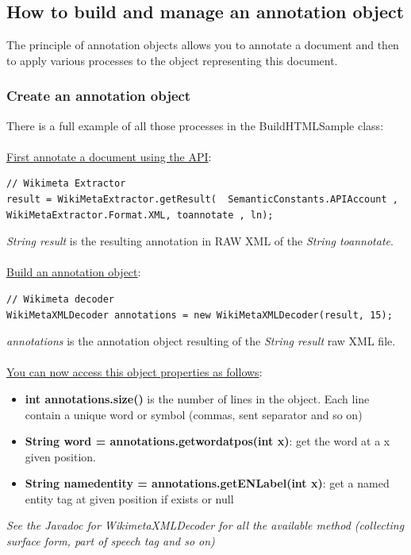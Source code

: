 \documentclass[11pt]{article}
\begin{document}
\subsection{How to build and manage an annotation object}
\label{ssec:annotobj}
The principle of annotation objects allows you to annotate a document and then to apply various processes to the object representing this document.

\subsubsection{Create an annotation object}
\label{sssec:creatannobj}
There is a full example of all those processes in the BuildHTMLSample class:\\
\\
\underline{First annotate a document using the API}:\\
\begin{lstlisting}
// Wikimeta Extractor 
result = WikiMetaExtractor.getResult(  SemanticConstants.APIAccount , WikiMetaExtractor.Format.XML, toannotate , ln);
\end{lstlisting}

\noindent\textit{String result} is the resulting annotation in RAW XML of the \textit{String toannotate}.\\
\\
\underline{Build an annotation object}:\\
\begin{lstlisting}
// Wikimeta decoder
WikiMetaXMLDecoder annotations = new WikiMetaXMLDecoder(result, 15);
\end{lstlisting}

\noindent\textit{annotations} is the annotation object resulting of the \noindent\textit{String result} raw XML file.\\
\\
\underline{You can now access this object properties as follows}:\\
\begin{itemize}
 \item \textbf{int annotations.size()} is the number of lines in the object. Each line contain a unique word or symbol (commas, sent separator and so on)
 \item \textbf{String word = annotations.getwordatpos(int x)}: get the word at a x given position.
 \item \textbf{String namedentity = annotations.getENLabel(int x)}: get a named entity tag at given position if exists or null
\end{itemize}
\textit{See the Javadoc for WikimetaXMLDecoder for all the available method (collecting surface form, part of speech tag and so on)}
\end{document}
